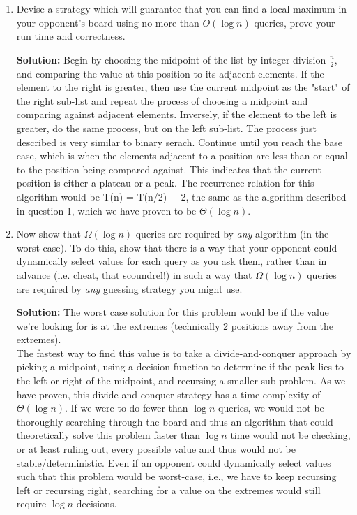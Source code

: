 \documentclass[10pt]{article}
\begin{document}
\begin{enumerate}
    \item Devise a strategy which will guarantee that you can find a local maximum in your opponent's board using no more than $O(\log n)$ queries, prove your run time and correctness.
    
    \textbf{Solution:}
    Begin by choosing the midpoint of the list by integer division $\frac{n}{2}$, and comparing the value at this position to its adjacent elements. If the element to the right is greater, then use the current midpoint as the "start" of the right sub-list and repeat the process of choosing a midpoint and comparing against adjacent elements. Inversely, if the element to the left is greater, do the same process, but on the left sub-list. The process just described is very similar to binary serach. Continue until you reach the base case, which is when the elements adjacent to a position are less than or equal to the position being compared against. This indicates that the current position is either a plateau or a peak. The recurrence relation for this algorithm would be T(n) = T(n/2) + 2, the same as the algorithm described in question 1, which we have proven to be $\Theta (\log n)$.
    
    \item Now show that $\Omega(\log n)$ queries are required by \emph{any} algorithm (in the worst case). To do this, show that there is a way that your opponent could dynamically select values for each query as you ask them, rather than in advance (i.e. cheat, that scoundrel!) in such a way that $\Omega(\log n)$ queries are required by \emph{any} guessing strategy you might use.
    
    \textbf{Solution:}
    The worst case solution for this problem would be if the value we're looking for is at the extremes (technically 2 positions away from the extremes).\\
    The fastest way to find this value is to take a divide-and-conquer approach by picking a midpoint, using a decision function to determine if the peak lies to the left or right of the midpoint, and recursing a smaller sub-problem. As we have proven, this divide-and-conquer strategy has a time complexity of $\Theta (\log n)$. If we were to do fewer than $\log n$ queries, we would not be thoroughly searching through the board and thus an algorithm that could theoretically solve this problem faster than $\log n$ time would not be checking, or at least ruling out, every possible value and thus would not be stable/deterministic. Even if an opponent could dynamically select values such that this problem would be worst-case, i.e., we have to keep recursing left or recursing right, searching for a value on the extremes would still require $\log n$ decisions.
    
\end{enumerate}
\end{document}
